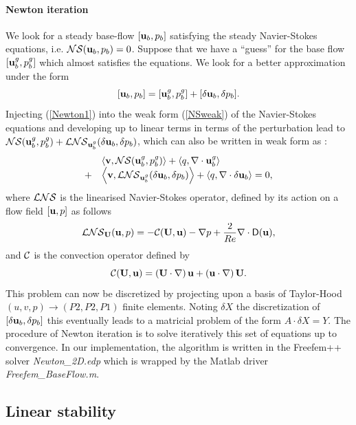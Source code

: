 \documentclass[twocolumn,10pt]{asme2ej}
\newcommand{\be}[1]{ \begin{equation} \label{#1}}
\newcommand{\ee}{\end{equation}}
\newcommand{\bes}[1]{ \begin{equation} \label{#1}\begin{array}{rl}}
\newcommand{\ees}{\end{array}\end{equation}}
\begin{document}
\paragraph{Newton iteration}


We look for a steady base-flow $[{\bf u}_b,p_b]$ satisfying the steady Navier-Stokes equations, i.e. 
${\cal NS} ({\bf u}_b,p_b) = 0$.
Suppose that we have a ``guess''  for the base flow $[{\bf u}_b^g,p_b^g]$  which almost satisfies the equations.  We look for a better approximation under the form
\be{Newton1}
[{\bf u}_b,p_b]  = [{\bf u}_b^g,p_b^g] + [\delta {\bf u}_b, \delta p_b].
\ee
Injecting (\ref{Newton1}) into the weak form (\ref{NSweak}) of the Navier-Stokes equations and developing up to linear terms in terms of the perturbation lead to  
${\cal NS}  ({\bf u}_b^g,p_b^g) +  {\cal LNS} _{{\bf u}_b^g}(\delta {\bf u}_b,\delta p_b)$, which can also be written in weak form as :
\bes{Newton2}
&\left< {\bf v}, {\cal NS} ({\bf u}_b^g,p_b^g)\right> + \left<q, \nabla \cdot {\bf u}_b^g\right>  
\\
+ &\left< { \bf v}, {\cal LNS} _{{\bf u}_b^g}( \delta {\bf u}_b,\delta p_b) \right> + \left<q, \nabla \cdot \delta{\bf u}_b\right> = 0,
\ees
where ${\cal LNS}$ is the linearised Navier-Stokes operator, defined by its action on a flow field $[{\bf u} , p]$ as follows 
\be{defNSL}
 {\cal LNS}_{{\bf U}}( {\bf u}, p) = - {\cal C}( {\bf U} , {\bf u}) -\nabla p
+\frac{2}{Re} \nabla  \cdot {\mathsf{D}}({\bf u}), %
 \ee
and ${\cal C}$ is the convection operator defined by 
\be{defC}
{\cal C}( {\bf U} , {\bf u}) = \left( {\bf U} \cdot \nabla \right) {\bf u} + \left( {\bf u} \cdot \nabla \right)  {\bf U}.
\ee
This problem can now be discretized by projecting upon a basis of Taylor-Hood $(u,v,p) \rightarrow (P2,P2,P1)$ finite elements. Noting $\delta X$ the discretization of $[\delta {\bf u}_b,\delta p_b]$ this eventually leads to a matricial problem of the form $A \cdot \delta X = Y$. The procedure of Newton iteration is to solve iteratively this set of equations up to convergence.
In our implementation, the algorithm is written in the Freefem++ solver {\em Newton\_2D.edp} 
which is wrapped by the Matlab driver {\em Freefem\_BaseFlow.m}.

\subsection{Linear stability}
\vspace{.2cm}
\end{document}
